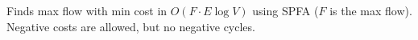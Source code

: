
Finds max flow with min cost in $O(F \cdot E \log V)$ using SPFA ($F$ is the max flow). Negative costs are allowed, but no negative cycles.


